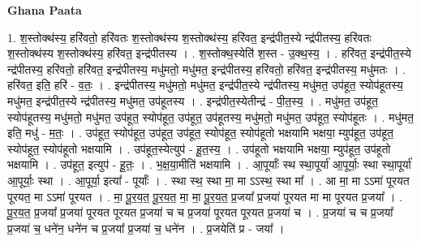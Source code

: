 \documentclass[17pt]{extarticle}
\begin{document}
\textbf{Ghana Paata } \newline

1. श॒स्तोक्थ॑स्य॒ हरि॑वतो॒ हरि॑वतः श॒स्तोक्थ॑स्य श॒स्तोक्थ॑स्य॒ हरि॑वत॒ इन्द्र॑पीत॒स्ये न्द्र॑पीतस्य॒ हरि॑वतः श॒स्तोक्थ॑स्य श॒स्तोक्थ॑स्य॒ हरि॑वत॒ इन्द्र॑पीतस्य । . श॒स्तोक्थ॒स्येति॑ श॒स्त - उ॒क्थ॒स्य॒ । . हरि॑वत॒ इन्द्र॑पीत॒स्ये न्द्र॑पीतस्य॒ हरि॑वतो॒ हरि॑वत॒ इन्द्र॑पीतस्य॒ मधु॑मतो॒ मधु॑मत॒ इन्द्र॑पीतस्य॒ हरि॑वतो॒ हरि॑वत॒ इन्द्र॑पीतस्य॒ मधु॑मतः । . हरि॑वत॒ इति॒ हरि॑ - व॒तः॒ । . इन्द्र॑पीतस्य॒ मधु॑मतो॒ मधु॑मत॒ इन्द्र॑पीत॒स्ये न्द्र॑पीतस्य॒ मधु॑मत॒ उप॑हूत॒ स्योप॑हूतस्य॒ मधु॑मत॒ इन्द्र॑पीत॒स्ये न्द्र॑पीतस्य॒ मधु॑मत॒ उप॑हूतस्य । . इन्द्र॑पीत॒स्येतीन्द्र॑ - पी॒त॒स्य॒ । . मधु॑मत॒ उप॑हूत॒ स्योप॑हूतस्य॒ मधु॑मतो॒ मधु॑मत॒ उप॑हूत॒ स्योप॑हूत॒ उप॑हूत॒ उप॑हूतस्य॒ मधु॑मतो॒ मधु॑मत॒ उप॑हूत॒ स्योप॑हूतः । . मधु॑मत॒ इति॒ मधु॑ - म॒तः॒ । . उप॑हूत॒ स्योप॑हूत॒ उप॑हूत॒ उप॑हूत॒ स्योप॑हूत॒ स्योप॑हूतो भक्षयामि भक्षया॒ म्युप॑हूत॒ उप॑हूत॒ स्योप॑हूत॒ स्योप॑हूतो भक्षयामि । . उप॑हूत॒स्येत्युप॑ - हू॒त॒स्य॒ । . उप॑हूतो भक्षयामि भक्षया॒ म्युप॑हूत॒ उप॑हूतो भक्षयामि । . उप॑हूत॒ इत्युप॑ - हू॒तः॒ । . भ॒क्ष॒या॒मीति॑ भक्षयामि । . आ॒पूर्याः᳚ स्थ स्था॒पूर्या॑ आ॒पूर्याः॒ स्था स्था॒पूर्या॑ आ॒पूर्याः॒ स्था । . आ॒पूर्या॒ इत्या᳚ - पूर्याः᳚ । . स्था स्थ॒ स्था मा॒ मा ऽऽस्थ॒ स्था मा᳚ । . आ मा॒ मा ऽऽमा॑ पूरयत पूरयत॒ मा ऽऽमा॑ पूरयत । . मा॒ पू॒र॒य॒त॒ पू॒र॒य॒त॒ मा॒ मा॒ पू॒र॒य॒त॒ प्र॒जया᳚ प्र॒जया॑ पूरयत मा मा पूरयत प्र॒जया᳚ । . पू॒र॒य॒त॒ प्र॒जया᳚ प्र॒जया॑ पूरयत पूरयत प्र॒जया॑ च च प्र॒जया॑ पूरयत पूरयत प्र॒जया॑ च । . प्र॒जया॑ च च प्र॒जया᳚ प्र॒जया॑ च॒ धने॑न॒ धने॑न च प्र॒जया᳚ प्र॒जया॑ च॒ धने॑न । . प्र॒जयेति॑ प्र - जया᳚ । \newline
\end{document}
